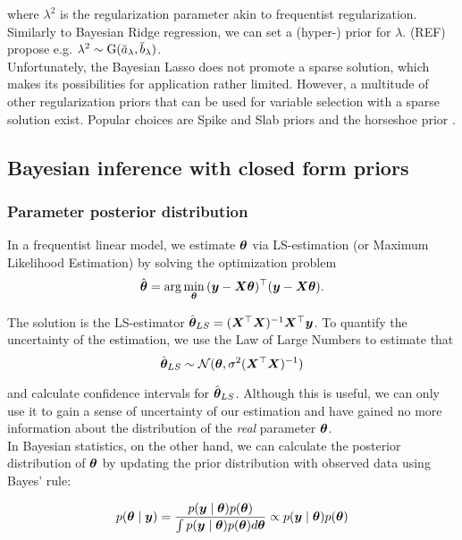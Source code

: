 where $\lambda^2$ is the regularization parameter akin to frequentist regularization.
Similarly to Bayesian Ridge regression, we can set a (hyper-) prior for $\lambda$.
(REF) propose e.g. $\lambda^2 \sim \text{G}(\breve{a}_\lambda, \breve{b}_\lambda)$.\\

Unfortunately, the Bayesian Lasso does not promote a sparse solution, which makes its possibilities for application rather limited.
However, a multitude of other regularization priors that can be used for variable selection with a sparse solution exist.
Popular choices are Spike and Slab priors \citep{mitchell_bayesian_1988} and the horseshoe prior \citep{carvalho_horseshoe_2010}.

\subsection{Bayesian inference with closed form priors}

\subsubsection*{Parameter posterior distribution}

In a frequentist linear model, we estimate $\bm{\theta}$ via LS-estimation (or Maximum Likelihood Estimation) by solving the optimization problem
\begin{equation*}
    \hat{\bm{\theta}} = \arg \min_{\bm{\theta}} {(\bm{y} - \bm{X} \bm{\theta})^\top (\bm{y} - \bm{X} \bm{\theta})}.
\end{equation*}

The solution is the LS-estimator $\hat{\bm{\theta}}_{LS} = (\bm{X}^\top \bm{X})^{-1} \bm{X}^\top \bm{y}$.
To quantify the uncertainty of the estimation, we use the Law of Large Numbers to estimate that
\begin{equation}\label{LSE}
    \hat{\bm{\theta}}_{LS} \sim \mathcal{N}(\bm{\theta}, \sigma^2 (\bm{X}^\top \bm{X})^{-1})
\end{equation}

and calculate confidence intervals for $\hat{\bm{\theta}}_{LS}$. Although this is useful, we can only use it to gain a sense of uncertainty of our estimation and have gained no more information about the distribution of the \textit{real} parameter $\bm{\theta}$. \\

In Bayesian statistics, on the other hand, we can calculate the posterior distribution of $\bm{\theta}$ by updating the prior distribution with observed data using Bayes' rule:

\begin{equation}\label{eq:bayes}
    p(\bm{\theta} \mid \bm{y}) = \frac{p(\bm{y} \mid \bm{\theta}) p(\bm{\theta})}{\int p(\bm{y} \mid \bm{\theta})p(\bm{\theta}) d \bm{\theta}} \propto p(\bm{y} \mid \bm{\theta}) p(\bm{\theta})
\end{equation}

